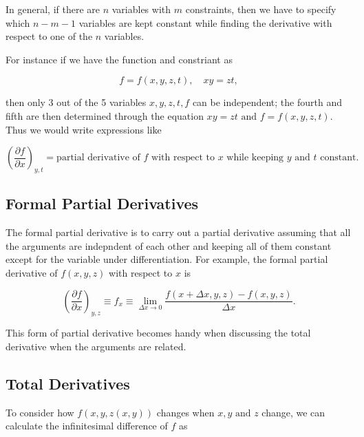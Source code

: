 \documentclass[english,a4paper,12pt]{report}
\begin{document}
In general, if there are \(n\) variables with \(m\) constraints, then we have to specify which \(n-m-1\) variables are kept constant while finding the derivative with respect to one of the \(n\) variables. 

For instance if we have the function and constriant as 

\begin{equation}
	f = f(x,y,z,t), \quad xy = zt,
\end{equation}

then only 3 out of the 5 variables \(x,y,z,t,f\) can be independent; the fourth and fifth are then determined through the equation \(xy = zt \text { and } f = f(x,y,z,t)\). Thus we would write expressions like

\begin{equation}
	\left( \frac{\partial f}{\partial x}  \right)_{y,t} = \text{partial derivative of \(f\) with respect to \(x\) while keeping \(y\) and \(t\) constant.}  
\end{equation}

\subsection{Formal Partial Derivatives}

The formal partial derivative is to carry out a partial derivative assuming that all the arguments are indepndent of each other and keeping all of them constant except for the variable under differentiation. For example, the formal partial derivative of \(f(x,y,z)\) with respect to \(x\) is 

\begin{equation}
	\left( \frac{\partial f}{\partial x} \right)_{y,z} \equiv f_{x} \equiv  \lim_{\Delta x \to 0} \frac{f(x+\Delta x,y,z) - f(x,y,z)}{\Delta x}.
\end{equation}

This form of partial derivative becomes handy when discussing the total derivative when the arguments are related.

\subsection{Total Derivatives}

To consider how \(f(x,y,z(x,y))\) changes when \(x,y \text { and } z\) change, we can calculate the infinitesimal difference of \(f\) as 
\end{document}
